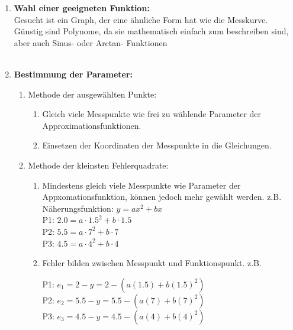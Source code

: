      	\begin{enumerate}
     	\item \textbf{Wahl einer geeigneten Funktion:}\\
     	Gesucht ist ein Graph, der eine ähnliche Form
		hat wie die Messkurve. Günstig sind Polynome, da sie mathematisch einfach zum
		beschreiben sind, aber auch Sinus- oder Arctan- Funktionen	\\ 
        \\
     	
        \item \textbf{Bestimmung der Parameter:}
          \begin{enumerate}
           \item Methode der ausgewählten Punkte:\\
          		\begin{enumerate}
                    \item Gleich viele Messpunkte wie frei zu wählende Parameter der
           			Approximationsfunktionen.
           			\item Einsetzen der Koordinaten der Messpunkte in die Gleichungen.
           		\end{enumerate}
           	\item Methode der kleinsten Fehlerquadrate:
           		\begin{enumerate}
                     \item Mindestens gleich viele Messpunkte wie Parameter der
           		Appxomationsfunktion, können jedoch mehr gewählt werden. z.B. \\
						Näherungsfunktion: $y = ax^2 + bx$ \\
						P1:		$2.0 = a\cdot 1.5^2+b\cdot 1.5$ \\
						P2: 	$5.5 = a\cdot 7^2+b\cdot 7$\\
						P3: 	$4.5 = a\cdot 4^2+b\cdot 4$         		
           		\item Fehler bilden zwischen Messpunkt und Funktionspunkt. z.B.\\
           		\begin{minipage}{10cm}
           				P1:  	$e_1=2-y=2-(a(1.5)+b(1.5)^2)$\\
           				P2:  	$e_2=5.5-y=5.5-(a(7)+b(7)^2)$\\
           				P3:  	$e_3=4.5-y=4.5-(a(4)+b(4)^2)$\\
           		\end{minipage}
				\begin{minipage}{6cm}

\end{minipage}
\end{enumerate}
\end{enumerate}
\end{enumerate}
